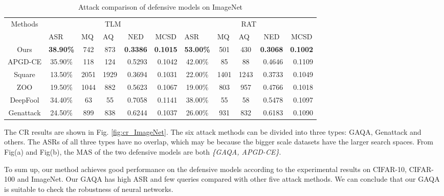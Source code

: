\documentclass[lettersize,journal]{IEEEtran}
\begin{document}
	\begin{table*}[t]
		\centering
		\caption{Attack comparison of defensive models on ImageNet}
		\begin{tabular}{ccccrrcccrr}
			\toprule
			\multirow{2}[4]{*}{Methods} & \multicolumn{5}{c}{TLM \cite{salman2020adversarially}} & \multicolumn{5}{c}{RAT \cite{wong2020fast}} \\
			\cmidrule(lr){2-6}  \cmidrule(lr){7-11}          & \multicolumn{1}{l}{ASR} & \multicolumn{1}{l}{MQ} & \multicolumn{1}{l}{AQ} & \multicolumn{1}{c}{NED} & \multicolumn{1}{c}{MCSD} & \multicolumn{1}{l}{ASR} & \multicolumn{1}{l}{MQ} & \multicolumn{1}{l}{AQ} & \multicolumn{1}{c}{NED} & \multicolumn{1}{c}{MCSD} \\
			\midrule
			Ours  & \textbf{38.90\%} & 742   & 873   & \textbf{0.3386} & \textbf{0.1015} & \textbf{53.00\%} & 501   & 430   & \textbf{0.3068} & \textbf{0.1002} \\
			APGD-CE & 35.90\% & 118   & 124   & 0.5293  & 0.1042  & 42.00\% & 85    & 88    & 0.4646  & 0.1109  \\
			Square & 13.50\% & 2051  & 1929  & 0.3694  & 0.1031  & 22.00\% & 1401  & 1243  & 0.3733  & 0.1049  \\
			ZOO   & 19.50\% & 1044  & 882   & 0.5623  & 0.1067  & 19.00\% & 803   & 957   & 0.4766  & 0.1018  \\
			DeepFool & 34.40\% & 63    & 55    & 0.7058  & 0.1141  & 38.00\% & 55    & 58    & 0.5478  & 0.1097  \\
			Genattack & 24.50\% & 899   & 838   & 0.6244  & 0.1037  & 26.00\% & 931   & 832   & 0.6183  & 0.1090  \\
			\bottomrule
		\end{tabular}%
		\label{tab:ImageNet-defense}%
	\end{table*}%
	
	The CR results are shown in Fig. \ref{fig:cr_ImageNet}. The six attack methods can be divided into three types: GAQA, Genattack and others. The ASRs of all three types have no overlap, which may be because the bigger scale datasets have the larger search spaces. From Fig(a) and Fig(b), the MAS of the two defensive models are both \emph{\{GAQA, APGD-CE\}}.
	
	
	To sum up, our method achieves good performance on the defensive models according to the experimental results on CIFAR-10, CIFAR-100 and ImageNet. Our GAQA has high ASR and few queries compared with other five attack methods. We can conclude that our GAQA is suitable to check the robustness of neural networks. 
	
\end{document}
